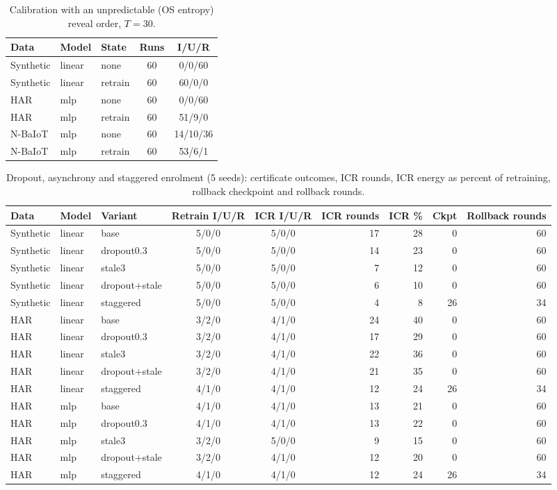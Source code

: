 \begin{table}[h]
\centering
\caption{Calibration with an unpredictable (OS entropy) reveal order, $T=30$.}\label{tab:s_beacon}
\footnotesize
\setlength{\tabcolsep}{3pt}
\begin{tabular}{@{}lllcc@{}}
\toprule
Data & Model & State & Runs & I/U/R \\
\midrule
Synthetic & linear & none & 60 & 0/0/60 \\
Synthetic & linear & retrain & 60 & 60/0/0 \\
HAR & mlp & none & 60 & 0/0/60 \\
HAR & mlp & retrain & 60 & 51/9/0 \\
N-BaIoT & mlp & none & 60 & 14/10/36 \\
N-BaIoT & mlp & retrain & 60 & 53/6/1 \\
\bottomrule
\end{tabular}
\end{table}

\begin{table}[h]
\centering
\caption{Dropout, asynchrony and staggered enrolment (5 seeds): certificate outcomes, ICR rounds, ICR energy as percent of retraining, rollback checkpoint and rollback rounds.}\label{tab:s_dyn}
\footnotesize
\setlength{\tabcolsep}{3pt}
\begin{tabular}{@{}lllccrrrr@{}}
\toprule
Data & Model & Variant & Retrain I/U/R & ICR I/U/R & ICR rounds & ICR \% & Ckpt & Rollback rounds \\
\midrule
Synthetic & linear & base & 5/0/0 & 5/0/0 & 17 & 28 & 0 & 60 \\
Synthetic & linear & dropout0.3 & 5/0/0 & 5/0/0 & 14 & 23 & 0 & 60 \\
Synthetic & linear & stale3 & 5/0/0 & 5/0/0 & 7 & 12 & 0 & 60 \\
Synthetic & linear & dropout+stale & 5/0/0 & 5/0/0 & 6 & 10 & 0 & 60 \\
Synthetic & linear & staggered & 5/0/0 & 5/0/0 & 4 & 8 & 26 & 34 \\
HAR & linear & base & 3/2/0 & 4/1/0 & 24 & 40 & 0 & 60 \\
HAR & linear & dropout0.3 & 3/2/0 & 4/1/0 & 17 & 29 & 0 & 60 \\
HAR & linear & stale3 & 3/2/0 & 4/1/0 & 22 & 36 & 0 & 60 \\
HAR & linear & dropout+stale & 3/2/0 & 4/1/0 & 21 & 35 & 0 & 60 \\
HAR & linear & staggered & 4/1/0 & 4/1/0 & 12 & 24 & 26 & 34 \\
HAR & mlp & base & 4/1/0 & 4/1/0 & 13 & 21 & 0 & 60 \\
HAR & mlp & dropout0.3 & 4/1/0 & 4/1/0 & 13 & 22 & 0 & 60 \\
HAR & mlp & stale3 & 3/2/0 & 5/0/0 & 9 & 15 & 0 & 60 \\
HAR & mlp & dropout+stale & 3/2/0 & 4/1/0 & 12 & 20 & 0 & 60 \\
HAR & mlp & staggered & 4/1/0 & 4/1/0 & 12 & 24 & 26 & 34 \\
\bottomrule
\end{tabular}
\end{table}


